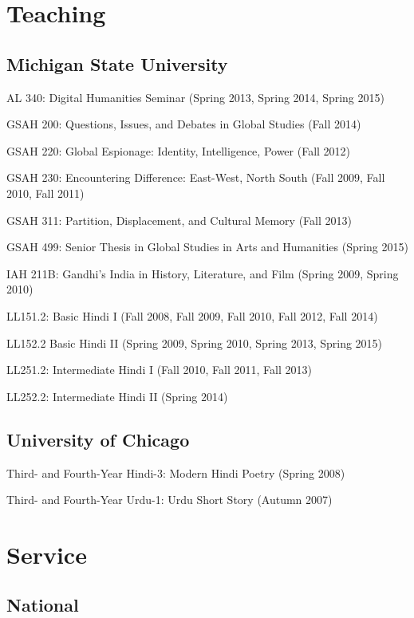 \documentclass[letterpaper,12pt]{article}
\begin{document}
\section{Teaching%
  \label{teaching}%
}


\subsection{Michigan State University%
  \label{michigan-state-university}%
}

AL 340: Digital Humanities Seminar (Spring 2013, Spring 2014, Spring 2015)

GSAH 200: Questions, Issues, and Debates in Global Studies (Fall 2014)

GSAH 220: Global Espionage: Identity, Intelligence, Power (Fall 2012)

GSAH 230: Encountering Difference: East-West, North South (Fall 2009, Fall 2010, Fall 2011)

GSAH 311: Partition, Displacement, and Cultural Memory (Fall 2013)

GSAH 499: Senior Thesis in Global Studies in Arts and Humanities (Spring 2015)

IAH 211B: Gandhi’s India in History, Literature, and Film (Spring 2009, Spring 2010)

LL151.2: Basic Hindi I (Fall 2008, Fall 2009, Fall 2010, Fall 2012, Fall 2014)

LL152.2 Basic Hindi II (Spring 2009, Spring 2010, Spring 2013, Spring 2015)

LL251.2: Intermediate Hindi I (Fall 2010, Fall 2011, Fall 2013)

LL252.2: Intermediate Hindi II (Spring 2014)


\subsection{University of Chicago%
  \label{university-of-chicago}%
}

Third- and Fourth-Year Hindi-3: Modern Hindi Poetry (Spring 2008)

Third- and Fourth-Year Urdu-1: Urdu Short Story (Autumn 2007)


\section{Service%
  \label{service}%
}


\subsection{National%
  \label{national}%
}
\end{document}

